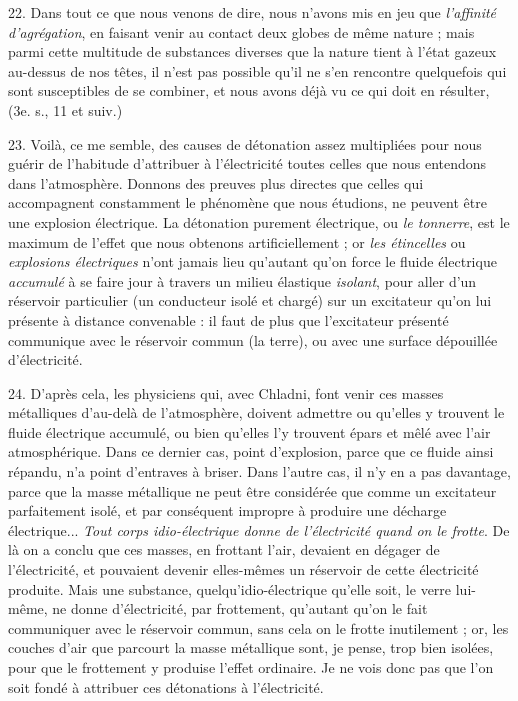 \documentclass[a4paper, 11pt, oneside, polutonikogreek, french]{article}
\begin{document}
22. Dans tout ce que nous venons de dire, nous n'avons mis en jeu que \emph{l'affinité d'agrégation}, en faisant venir au contact deux globes de même nature ; mais parmi cette multitude de substances diverses que la nature tient à l'état gazeux au-dessus de nos têtes, il n'est pas possible qu'il ne s'en rencontre quelquefois qui sont susceptibles de se combiner, et nous avons déjà vu ce qui doit en résulter, (3e. s., 11 et suiv.)

23. Voilà, ce me semble, des causes de détonation assez multipliées pour nous guérir de l'habitude d'attribuer à l'électricité toutes celles que nous entendons dans l'atmosphère. Donnons des preuves plus directes que celles qui accompagnent constamment le phénomène que nous étudions, ne peuvent être une explosion électrique. La détonation purement électrique, ou \emph{le tonnerre}, est le maximum de l'effet que nous obtenons artificiellement ; or \emph{les étincelles} ou \emph{explosions électriques} n'ont jamais lieu qu'autant qu'on force le fluide électrique \emph{accumulé} à se faire jour à travers un milieu élastique \emph{isolant}, pour aller d'un réservoir particulier (un conducteur isolé et chargé) sur un excitateur qu'on lui présente à distance convenable : il faut de plus que l'excitateur présenté communique avec le réservoir commun (la terre), ou avec une surface dépouillée d'électricité.

24. D'après cela, les physiciens qui, avec Chladni, font venir ces masses métalliques d'au-delà de l'atmosphère, doivent admettre ou qu'elles y trouvent le fluide électrique accumulé, ou bien qu'elles l'y trouvent épars et mêlé avec l'air atmosphérique. Dans ce dernier cas, point d'explosion, parce que ce fluide ainsi répandu, n'a point d'entraves à briser. Dans l'autre cas, il n'y en a pas davantage, parce que la masse métallique ne peut être considérée que comme un excitateur parfaitement isolé, et par conséquent impropre à produire une décharge électrique... \emph{Tout corps idio-électrique donne de l'électricité quand on le frotte}. De là on a conclu que ces masses, en frottant l'air, devaient en dégager de l'électricité, et pouvaient devenir elles-mêmes un réservoir de cette électricité produite. Mais une substance, quelqu'idio-électrique qu'elle soit, le verre lui-même, ne donne d'électricité, par frottement, qu'autant qu'on le fait communiquer avec le réservoir commun, sans cela on le frotte inutilement ; or, les couches d'air que parcourt la masse métallique sont, je pense, trop bien isolées, pour que le frottement y produise l'effet ordinaire. Je ne vois donc pas que l'on soit fondé à attribuer ces détonations à l'électricité.
\end{document}
